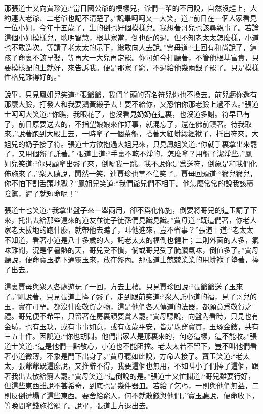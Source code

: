 \begin{parag}
    那張道士又向賈珍道:“當日國公爺的模樣兒，爺們一輩的不用說，自然沒趕上，大約連大老爺、二老爺也記不清楚了。”說畢呵呵又一大笑，道:“前日在一個人家看見一位小姐，今年十五歲了，生的倒也好個模樣兒。我想著哥兒也該尋親事了。若論這個小姐模樣兒，聰明智慧，根基家當，倒也配的過。但不知老太太怎麼樣，小道也不敢造次。等請了老太太的示下，纔敢向人去說。”賈母道:“上回有和尚說了，這孩子命裏不該早娶，等再大一大兒再定罷。你可如今打聽著，不管他根基富貴，只要模樣配的上就好，來告訴我。便是那家子窮，不過給他幾兩銀子罷了。只是模樣性格兒難得好的。”
\end{parag}


\begin{parag}
    說畢，只見鳳姐兒笑道:“張爺爺，我們丫頭的寄名符兒你也不換去。前兒虧你還有那麼大臉，打發人和我要鵝黃緞子去！要不給你，又恐怕你那老臉上過不去。”張道士呵呵大笑道:“你瞧，我眼花了，也沒看見奶奶在這裏，也沒道多謝。符早已有了，前日原要送去的，不指望娘娘來作好事，就混忘了，還在佛前鎮著。待我取來。”說著跑到大殿上去，一時拿了一個茶盤，搭著大紅蟒緞經袱子，托出符來。大姐兒的奶子接了符。張道士方欲抱過大姐兒來，只見鳳姐笑道:“你就手裏拿出來罷了，又用個盤子託著。” 張道士道:“手裏不乾不淨的，怎麼拿？用盤子潔淨些。”鳳姐兒笑道:“你只顧拿出盤子來，倒唬我一跳。我不說你是爲送符，倒象是和我們化佈施來了。”衆人聽說，鬨然一笑，連賈珍也掌不住笑了。賈母回頭道:“猴兒猴兒，你不怕下割舌頭地獄？”鳳姐兒笑道:“我們爺兒們不相干。他怎麼常常的說我該積陰騭，遲了就短命呢！”
\end{parag}


\begin{parag}
    張道士也笑道:“我拿出盤子來一舉兩用，卻不爲化佈施，倒要將哥兒的這玉請了下來，托出去給那些遠來的道友並徒子徒孫們見識見識。”賈母道:“既這們著，你老人家老天拔地的跑什麼，就帶他去瞧了，叫他進來，豈不省事？”張道士道:“老太太不知道，看著小道是八十多歲的人，託老太太的福倒也健壯；二則外面的人多，氣味難聞，況是個暑熱的天，哥兒受不慣，倘或哥兒受了腌臢氣味，倒值多了。”賈母聽說，便命寶玉摘下通靈玉來，放在盤內。那張道士兢兢業業的用蟒袱子墊著，捧了出去。
\end{parag}


\begin{parag}
    這裏賈母與衆人各處遊玩了一回，方去上樓。只見賈珍回說:“張爺爺送了玉來了。”剛說著，只見張道士捧了盤子，走到跟前笑道:“衆人託小道的福，見了哥兒的玉，實在可罕。都沒什麼敬賀之物，這是他們各人傳道的法器，都願意爲敬賀之禮。哥兒便不希罕，只留著在房裏頑耍賞人罷。”賈母聽說，向盤內看時，只見也有金璜，也有玉玦，或有事事如意，或有歲歲平安，皆是珠穿寶貫，玉琢金鏤，共有三五十件。因說道:“你也胡鬧。他們出家人是那裏來的，何必這樣，這不能收。”張道士笑道:“這是他們一點敬心，小道也不能阻擋。老太太若不留下，豈不叫他們看著小道微薄，不象是門下出身了。”賈母聽如此說，方命人接了。寶玉笑道:“老太太，張爺爺既這麼說，又推辭不得，我要這個也無用，不如叫小子們捧了這個，跟著我出去散給窮人罷。”賈母笑道:“這倒說的是。”張道士又忙攔道:“哥兒雖要行好，但這些東西雖說不甚希奇，到底也是幾件器皿。若給了乞丐，一則與他們無益，二則反倒遭塌了這些東西。要舍給窮人，何不就散錢與他們。”寶玉聽說，便命收下，等晚間拿錢施捨罷了。說畢，張道士方退出去。
\end{parag}


